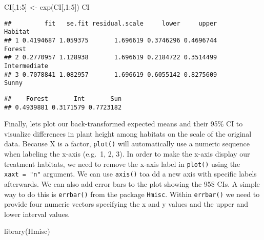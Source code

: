 \documentclass[
]{article}
\newenvironment{Shaded}{\begin{snugshade}}{\end{snugshade}}
\newcommand{\DecValTok}[1]{\textcolor[rgb]{0.00,0.00,0.81}{#1}}
\newcommand{\FunctionTok}[1]{\textcolor[rgb]{0.00,0.00,0.00}{#1}}
\newcommand{\NormalTok}[1]{#1}
\newcommand{\OtherTok}[1]{\textcolor[rgb]{0.56,0.35,0.01}{#1}}
\newcommand{\SpecialCharTok}[1]{\textcolor[rgb]{0.00,0.00,0.00}{#1}}
\begin{document}
\begin{Shaded}
\begin{Highlighting}[]
\NormalTok{CI[,}\DecValTok{1}\SpecialCharTok{:}\DecValTok{5}\NormalTok{] }\OtherTok{\textless{}{-}} \FunctionTok{exp}\NormalTok{(CI[,}\DecValTok{1}\SpecialCharTok{:}\DecValTok{5}\NormalTok{])}
\NormalTok{CI}
\end{Highlighting}
\end{Shaded}

\begin{verbatim}
##         fit   se.fit residual.scale     lower     upper      Habitat
## 1 0.4194687 1.059375       1.696619 0.3746296 0.4696744       Forest
## 2 0.2770957 1.128938       1.696619 0.2184722 0.3514499 Intermediate
## 3 0.7078841 1.082957       1.696619 0.6055142 0.8275609        Sunny
\end{verbatim}

\begin{Shaded}
\end{Shaded}

\begin{verbatim}
##    Forest       Int       Sun 
## 0.4939881 0.3171579 0.7723182
\end{verbatim}

Finally, lets plot our back-transformed expected means and their 95\% CI
to visualize differences in plant height among habitats on the scale of
the original data. Because X is a factor, \texttt{plot()} will
automatically use a numeric sequence when labeling the x-axis (e.g.~1,
2, 3). In order to make the x-axis display our treatment habitats, we
need to remove the x-axis label in \texttt{plot()} using the
\texttt{xaxt\ =\ "n"} argument. We can use \texttt{axis()} toa dd a new
axis with specific labels afterwards. We can also add error bars to the
plot showing the 95\$ CIs. A simple way to do this is \texttt{errbar()}
from the package \texttt{Hmisc}. Within \texttt{errbar()} we need to
provide four numeric vectors specifying the x and y values and the upper
and lower interval values.

\begin{Shaded}
\begin{Highlighting}[]
\FunctionTok{library}\NormalTok{(Hmisc)}
\end{Highlighting}
\end{Shaded}
\end{document}
